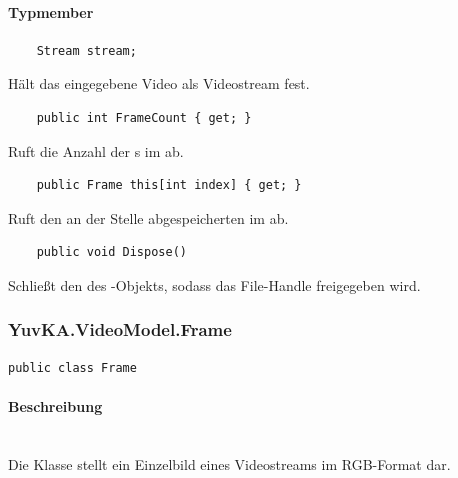 \paragraph{Typmember}
\begin{itemize}

	\begin{verbatim}
	Stream stream;
	\end{verbatim}
	Hält das eingegebene Video als Videostream fest.

	\begin{verbatim}
	public int FrameCount { get; }
	\end{verbatim}
	Ruft die Anzahl der s im  ab.

	\begin{verbatim}
	public Frame this[int index] { get; }
	\end{verbatim}
	Ruft den an der Stelle  abgespeicherten  im  ab.

	\begin{verbatim}
	public void Dispose()
	\end{verbatim}
	Schließt den  des -Objekts, sodass das File-Handle freigegeben wird.

\end{itemize}

\subsubsection{YuvKA.VideoModel.Frame}

\begin{verbatim}
public class Frame
\end{verbatim}

\paragraph{Beschreibung}~\\
Die Klasse  stellt ein Einzelbild eines Videostreams im RGB-Format dar.

